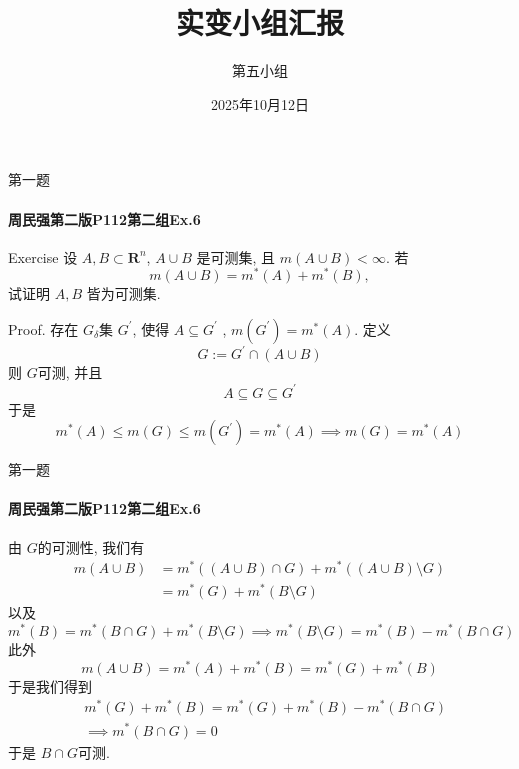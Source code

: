 \documentclass{beamer}
\title{实变小组汇报}
\author{第五小组}
\date{2025年10月12日}
\begin{document}
\maketitle



\begin{frame}[fragile]{第一题}
\framesubtitle{周民强第二版P112第二组Ex.6 }

\begin{block}{Exercise}
设 $A,B \subset \mathbf{R}^n$, $A \cup B$ 是可测集, 且 $m(A \cup B) < \infty$. 若
\[m(A \cup B) = m^*(A) + m^*(B),\]
试证明 $A,B$ 皆为可测集.
\end{block}
Proof.    存在 \(  G_{ \delta }  \)集 \(  G^{\prime}   \), 使得 \(  A\subseteq G^{\prime}   \)  , \(  m  \left( G^{\prime}  \right)= m^{*}\left( A \right)  \). 定义 \[
    G:= G^{\prime} \cap \left( A\cup B \right) 
    \]则 \(  G  \)可测, 并且  \[
    A\subseteq G\subseteq G^{\prime} 
    \]   于是 \[
    m^{*}\left( A \right)\le  m\left( G \right)\le m \left( G^{\prime}  \right)= m^{*}\left( A \right)\implies m\left( G \right)= m^{*}\left( A \right)    
    \]
    
\end{frame}


\begin{frame}[fragile]{第一题}
\framesubtitle{周民强第二版P112第二组Ex.6 }

    由 \(  G  \)的可测性, 我们有 \[
  \begin{aligned}
  m\left( A\cup B \right)&= m^{*}\left( \left( A\cup B \right)\cap G  \right)+ m^{*}\left( \left( A\cup B \right)\setminus G  \right)  \\ 
   &=  m^{*}\left( G \right)+ m^{*}\left( B\setminus G \right)  
  \end{aligned}  
    \] 以及 \[
    m^{*}\left( B \right)= m^{*}\left( B\cap G\right)+ m^{*}\left( B\setminus G \right)   \implies m^{*}\left( B\setminus G \right)= m^{*}\left( B \right)-m^{*}\left( B\cap G \right)   
    \]此外 \[
    m\left( A\cup B \right)= m^{*}\left( A \right)+ m^{*}\left( B \right)= m^{*}\left( G \right)+ m^{*}\left( B \right)     
    \]于是我们得到 \[
    \begin{aligned}
   & m^{*}\left( G \right)+ m^{*}\left( B \right)= m^{*}\left( G \right)+ m^{*}\left( B \right)-m^{*}\left( B\cap G \right)    \\ 
    &\implies m^{*}\left( B\cap G \right)= 0 
    \end{aligned}
    \]于是 \(  B\cap G  \)可测. 
\end{frame}
\end{document}
